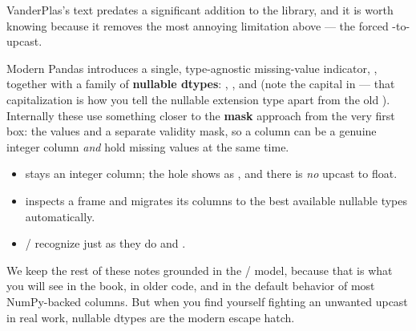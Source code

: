\documentclass[11pt]{article}
\begin{document}
\begin{background}
VanderPlas's text predates a significant addition to the library, and it is worth knowing because it removes the most annoying limitation above --- the forced -to- upcast.

Modern Pandas introduces a single, type-agnostic missing-value indicator, , together with a family of \textbf{nullable dtypes}: , , and  (note the capital  in  --- that capitalization is how you tell the nullable extension type apart from the old ). Internally these use something closer to the \textbf{mask} approach from the very first box: the values and a separate validity mask, so a column can be a genuine integer column \emph{and} hold missing values at the same time.

\begin{itemize}
  \item {} stays an integer column; the hole shows as , and there is \emph{no} upcast to float.
  \item {} inspects a frame and migrates its columns to the best available nullable types automatically.
  \item {}/ recognize  just as they do  and .
\end{itemize}

We keep the rest of these notes grounded in the / model, because that is what you will see in the book, in older code, and in the default behavior of most NumPy-backed columns. But when you find yourself fighting an unwanted upcast in real work, nullable dtypes are the modern escape hatch.
\end{background}
\end{document}

